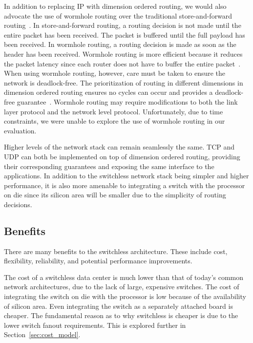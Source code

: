 In addition to replacing IP with dimension ordered routing, we would also advocate the use of wormhole routing over the traditional store-and-forward routing~\cite{Ni:1993:SWRTDN}.  In store-and-forward routing, a routing decision is not made until the entire packet has been received.  The packet is buffered until the full payload has been received.  In wormhole routing, a routing decision is made as soon as the header has been received.  Wormhole routing is more efficient because it reduces the packet latency since each router does not have to buffer the entire packet~\cite{Boppana:1995:FTWRAMN,Dally:1987:DFMRMIN,Ni:1993:SWRTDN}.  When using wormhole routing, however, care must be taken to ensure the network is deadlock-free.  The prioritization of routing in different dimensions in dimension ordered routing ensures no cycles can occur and provides a deadlock-free guarantee~\cite{Ni:1993:SWRTDN}.  Wormhole routing may require modifications to both the link layer protocol and the network level protocol.  Unfortunately, due to time constraints, we were unable to explore the use of wormhole routing in our evaluation.

Higher levels of the network stack can remain seamlessly the same.  TCP and UDP can both be implemented on top of dimension ordered routing, providing their corresponding guarantees and exposing the same interface to the applications. In addition to the switchless network stack being simpler and higher performance, it is also more amenable to integrating a switch with the processor on die since its silicon area will be smaller due to the simplicity of routing decisions.

\subsection{Benefits}

There are many benefits to the switchless architecture.  These include cost, flexibility, reliability, and potential performance improvements.  

The cost of a switchless data center is much lower than that of today's common network architectures, due to the lack of large, expensive switches.  The cost of integrating the switch on die with the processor is low because of the availability of silicon area.  Even integrating the switch as a separately attached board is cheaper.  The fundamental reason as to why switchless is cheaper is due to the lower switch fanout requirements.  This is explored further in Section~\ref{sec:cost_model}.

